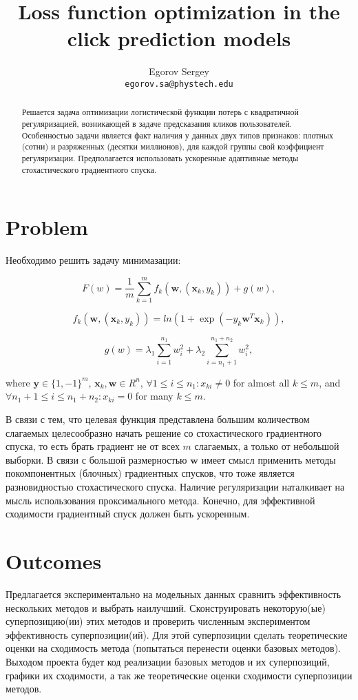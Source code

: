 \documentclass[]{scrartcl}
\title{Loss function optimization in the click prediction models}
\author{\begin{tabular}{c c}
	  	 Egorov Sergey\\
		 \texttt{egorov.sa@phystech.edu}
		\end{tabular}}
\begin{document}
\maketitle

\begin{abstract}

Решается задача оптимизации логистической функции потерь с квадратичной регуляризацией, возникающей в задаче предсказания кликов пользователей. Особенностью задачи является факт наличия у данных двух типов признаков: плотных (сотни) и разряженных (десятки миллионов), для каждой группы свой коэффициент регуляризации. Предполагается использовать ускоренные адаптивные методы стохастического градиентного спуска.
\end{abstract}

\section{Problem}

Необходимо решить задачу минимазации:

$$F(w)=\frac{1}{m}\sum\limits_{k=1}^{m}f_k(\boldsymbol w,(\boldsymbol x_k, y_k))+g(w),$$

$$f_k(\boldsymbol w,(\boldsymbol x_k, y_k)) = ln(1+\exp(-y_k\boldsymbol w^T \boldsymbol x_k)),$$

$$g(w)=\lambda_1\sum\limits_{i=1}^{n_1}w_i^2 + \lambda_2\sum\limits_{i=n_1+1}^{n_1+n_2}w_i^2,$$

where $\boldsymbol y\in\{1,-1\}^m$, $\boldsymbol x_k, \boldsymbol w\in R^n$, $\forall 1\leq i\leq n_1:x_{ki} \neq 0$ for almost all $k\leq m$, and $\forall n_1+1\leq i\leq n_1+n_2:x_{ki} = 0$ for many $k\leq m$.

В связи с тем, что целевая функция представлена большим количеством слагаемых целесообразно начать решение со стохастического градиентного спуска, то есть брать градиент не от всех $m$ слагаемых, а только от небольшой выборки. В связи с большой размерностью $\boldsymbol w$ имеет смысл применить методы покомпонентных (блочных) градиентных спусков, что тоже является разновидностью стохастического спуска. Наличие регуляризации наталкивает на мысль использования проксимального метода. Конечно, для эффективной сходимости градиентный спуск должен быть ускоренным.

\section{Outcomes}

Предлагается экспериментально на модельных данных сравнить эффективность нескольких методов и выбрать наилучший. Сконструировать некоторую(ые) суперпозицию(ии) этих методов и проверить численным экспериментом эффективность суперпозиции(ий). Для этой суперпозиции сделать теоретические оценки на сходимость метода (попытаться перенести оценки базовых методов). Выходом проекта будет код реализации базовых методов и их суперпозиций, графики их сходимости, а так же теоретические оценки сходимости суперпозиции методов.
\end{document}
